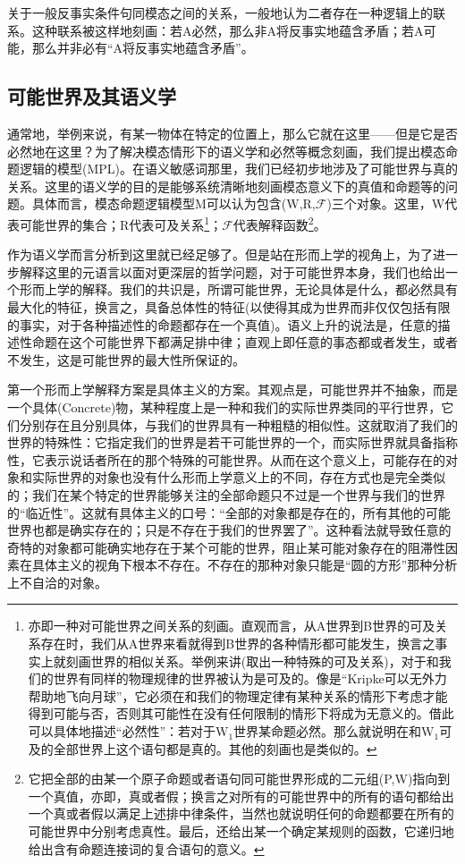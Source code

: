\documentclass{article}
\begin{document}
关于一般反事实条件句同模态之间的关系，一般地认为二者存在一种逻辑上的联系。这种联系被这样地刻画：若A必然，那么非A将反事实地蕴含矛盾；若A可能，那么并非必有“A将反事实地蕴含矛盾”。
\subsection{可能世界及其语义学}
通常地，举例来说，有某一物体在特定的位置上，那么它就在这里——但是它是否必然地在这里？为了解决模态情形下的语义学和必然等概念刻画，我们提出模态命题逻辑的模型(MPL)。在语义敏感词那里，我们已经初步地涉及了可能世界与真的关系。这里的语义学的目的是能够系统清晰地刻画模态意义下的真值和命题等的问题。具体而言，模态命题逻辑模型M可以认为包含(W,R,$\mathscr{F}$)三个对象。这里，W代表可能世界的集合；R代表可及关系\footnote{亦即一种对可能世界之间关系的刻画。直观而言，从A世界到B世界的可及关系存在时，我们从A世界来看就得到B世界的各种情形都可能发生，换言之事实上就刻画世界的相似关系。举例来讲(取出一种特殊的可及关系)，对于和我们的世界有同样的物理规律的世界被认为是可及的。像是“Kripke可以无外力帮助地飞向月球”，它必须在和我们的物理定律有某种关系的情形下考虑才能得到可能与否，否则其可能性在没有任何限制的情形下将成为无意义的。借此可以具体地描述“必然性”：若对于$\mathrm{W_1}$世界某命题必然。那么就说明在和$\mathrm{W_1}$可及的全部世界上这个语句都是真的。其他的刻画也是类似的。}；$\mathscr{F}$代表解释函数\footnote{它把全部的由某一个原子命题或者语句同可能世界形成的二元组(P,W)指向到一个真值，亦即，真或者假；换言之对所有的可能世界中的所有的语句都给出一个真或者假以满足上述排中律条件，当然也就说明任何的命题都要在所有的可能世界中分别考虑真性。最后，还给出某一个确定某规则的函数，它递归地给出含有命题连接词的复合语句的意义。}。

作为语义学而言分析到这里就已经足够了。但是站在形而上学的视角上，为了进一步解释这里的元语言以面对更深层的哲学问题，对于可能世界本身，我们也给出一个形而上学的解释。我们的共识是，所谓可能世界，无论具体是什么，都必然具有最大化的特征，换言之，具备总体性的特征(以使得其成为世界而非仅仅包括有限的事实，对于各种描述性的命题都存在一个真值)。语义上升的说法是，任意的描述性命题在这个可能世界下都满足排中律；直观上即任意的事态都或者发生，或者不发生，这是可能世界的最大性所保证的。

第一个形而上学解释方案是具体主义的方案。其观点是，可能世界并不抽象，而是一个具体(Concrete)物，某种程度上是一种和我们的实际世界类同的平行世界，它们分别存在且分别具体，与我们的世界具有一种粗糙的相似性。这就取消了我们的世界的特殊性：它指定我们的世界是若干可能世界的一个，而实际世界就具备指称性，它表示说话者所在的那个特殊的可能世界。从而在这个意义上，可能存在的对象和实际世界的对象也没有什么形而上学意义上的不同，存在方式也是完全类似的；我们在某个特定的世界能够关注的全部命题只不过是一个世界与我们的世界的“临近性”。这就有具体主义的口号：“全部的对象都是存在的，所有其他的可能世界也都是确实存在的；只是不存在于我们的世界罢了”。这种看法就导致任意的奇特的对象都可能确实地存在于某个可能的世界，阻止某可能对象存在的阻滞性因素在具体主义的视角下根本不存在。不存在的那种对象只能是“圆的方形”那种分析上不自洽的对象。
\end{document}
